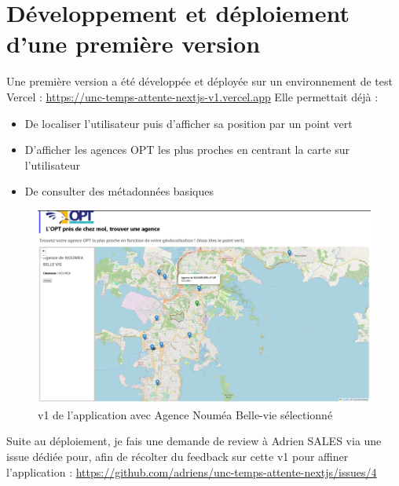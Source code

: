 \documentclass[12pt,a4paper]{report}
\begin{document}
\newpage

\section{Développement et déploiement d'une première version}
Une première version a été développée et déployée sur un environnement de test Vercel : \href{https://unc-temps-attente-nextjs-v1.vercel.app}{https://unc-temps-attente-nextjs-v1.vercel.app}
Elle permettait déjà :
\begin{itemize}
    \item De localiser l’utilisateur puis d'afficher sa position par un point vert
    \item D’afficher les agences OPT les plus proches en centrant la carte sur l'utilisateur
    \item De consulter des métadonnées basiques
\end{itemize}

\begin{figure}[h] %
    \centering
    \includegraphics[width=1\textwidth]{ressources_rapport/app_opt_v1.JPG}
    \caption{v1 de l'application avec Agence Nouméa Belle-vie sélectionné}
\end{figure}
\vspace{1cm}
Suite au déploiement, je fais une demande de review  à Adrien SALES via une issue dédiée pour, afin de récolter du feedback sur cette v1 pour affiner l'application : \href{https://github.com/adriens/unc-temps-attente-nextjs/issues/4}{https://github.com/adriens/unc-temps-attente-nextjs/issues/4}
\end{document}
